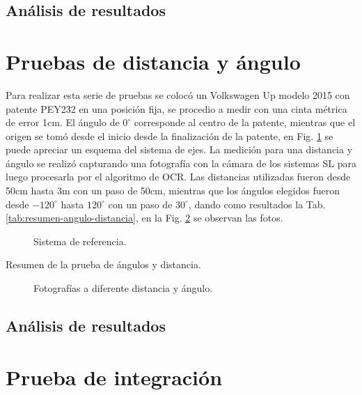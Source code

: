 \subsection{Análisis de resultados}

\section{Pruebas de distancia y ángulo}

Para realizar esta serie de pruebas se colocó un Volkswagen Up modelo 2015 con patente PEY232 en una posición fija, se procedio a medir con una cinta métrica de error 1cm. El ángulo de $0^\circ$ corresponde al centro de la patente, mientras que el origen se tomó desde el inicio desde la finalización de la patente, en Fig. \ref{fig:sistema-medicion-angulos} se puede apreciar un esquema del sistema de ejes. La medición para una distancia y ángulo se realizó capturando una fotografía con la cámara de los sistemas SL para luego procesarla por el algoritmo de OCR. Las distancias utilizadas fueron desde 50cm hasta 3m con un paso de 50cm, mientras que los ángulos elegidos fueron desde $-120^\circ$ hasta $120^\circ$ con un paso de $30^\circ$, dando como resultados la Tab. \ref{tab:resumen-angulo-distancia}, en la Fig. \ref{fig:angulo-distancia} se observan las fotos.

\begin{figure}
    \centering

    \caption{Sistema de referencia.}
    \label{fig:sistema-medicion-angulos}
\end{figure}

\begin{table}
    \centering

    \caption[short]{Resumen de la prueba de ángulos y distancia.}
    \label{tab:resumen-angulo-distancia}
\end{table}

\begin{figure}
    \centering

    \caption{Fotografías a diferente distancia y ángulo.}
    \label{fig:angulo-distancia}
\end{figure}


\subsection{Análisis de resultados}

\section{Prueba de integración}

